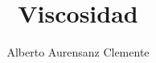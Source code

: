 \documentclass[twoside,twocolumn,spanish]{article}
\begin{document}
    \title{Viscosidad}
    \author{Alberto Aurensanz Clemente}
    \maketitle

    
    
    
    
    
    
    
\end{document}
